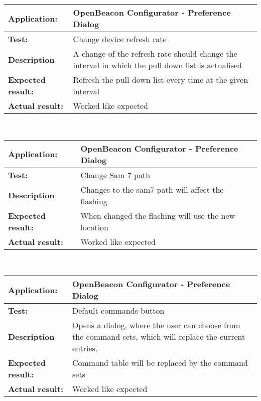    \begin{tabular}{|p{3.5cm}|p{10.5cm}|}
    \hline
     \textbf{Application:}	& OpenBeacon Configurator - Preference Dialog\\
    \hline
     \textbf{Test:}		& Change device refresh rate\\
    \hline
     \textbf{Description}	& A change of the refresh rate should change the interval in which the pull down list is actualised\\
    \hline
     \textbf{Expected result:}	& Refresh the pull down list every time at the given interval\\
    \hline
     \textbf{Actual result:}	& Worked like expected\\
    \hline
   \end{tabular}\\
   \begin{tabular}{|p{3.5cm}|p{10.5cm}|}
    \hline
     \textbf{Application:}	& OpenBeacon Configurator - Preference Dialog\\
    \hline
     \textbf{Test:}		& Change Sam 7 path\\
    \hline
     \textbf{Description}	& Changes to the sam7 path will affect the flashing\\
    \hline
     \textbf{Expected result:}	& When changed the flashing will use the new location\\
    \hline
     \textbf{Actual result:}	& Worked like expected\\
    \hline
   \end{tabular}\\
   \begin{tabular}{|p{3.5cm}|p{10.5cm}|}
    \hline
     \textbf{Application:}	& OpenBeacon Configurator - Preference Dialog\\
    \hline
     \textbf{Test:}		& Default commands button\\
    \hline
     \textbf{Description}	& Opens a dialog, where the user can choose from the command sets, which will replace the current entries.\\
    \hline
     \textbf{Expected result:}	& Command table will be replaced by the command sets\\
    \hline
     \textbf{Actual result:}	& Worked like expected\\
    \hline
   \end{tabular}\\
